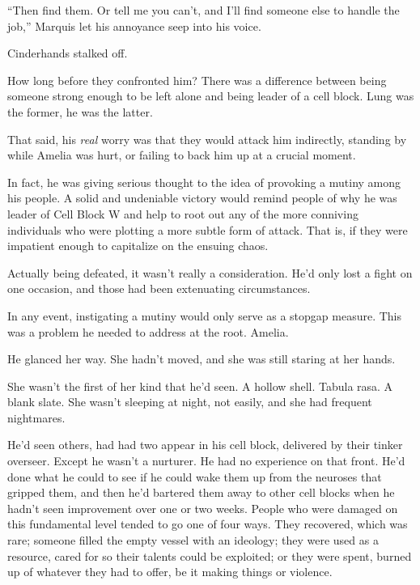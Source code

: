 ``Then find them.  Or tell me you can't, and I'll find someone else to handle the job,'' Marquis let his annoyance seep into his voice.



Cinderhands stalked off.



How long before they confronted him?  There was a difference between being someone strong enough to be left alone and being leader of a cell block.  Lung was the former, he was the latter.



That said, his \emph{real} worry was that they would attack him indirectly, standing by while Amelia was hurt, or failing to back him up at a crucial moment.



In fact, he was giving serious thought to the idea of provoking a mutiny among his people.  A solid and undeniable victory would remind people of why he was leader of Cell Block W and help to root out any of the more conniving individuals who were plotting a more subtle form of attack.  That is, if they were impatient enough to capitalize on the ensuing chaos.



Actually being defeated, it wasn't really a consideration.  He'd only lost a fight on one occasion, and those had been extenuating circumstances.



In any event, instigating a mutiny would only serve as a stopgap measure.  This was a problem he needed to address at the root.  Amelia.



He glanced her way.  She hadn't moved, and she was still staring at her hands.



She wasn't the first of her kind that he'd seen.  A hollow shell.  Tabula rasa.  A blank slate. She wasn't sleeping at night, not easily, and she had frequent nightmares.



He'd seen others, had had two appear in his cell block, delivered by their tinker overseer.  Except he wasn't a nurturer.  He had no experience on that front.  He'd done what he could to see if he could wake them up from the neuroses that gripped them, and then he'd bartered them away to other cell blocks when he hadn't seen improvement over one or two weeks.  People who were damaged on this fundamental level tended to go one of four ways.  They recovered, which was rare; someone filled the empty vessel with an ideology; they were used as a resource, cared for so their talents could be exploited; or they were spent, burned up of whatever they had to offer, be it making things or violence.



